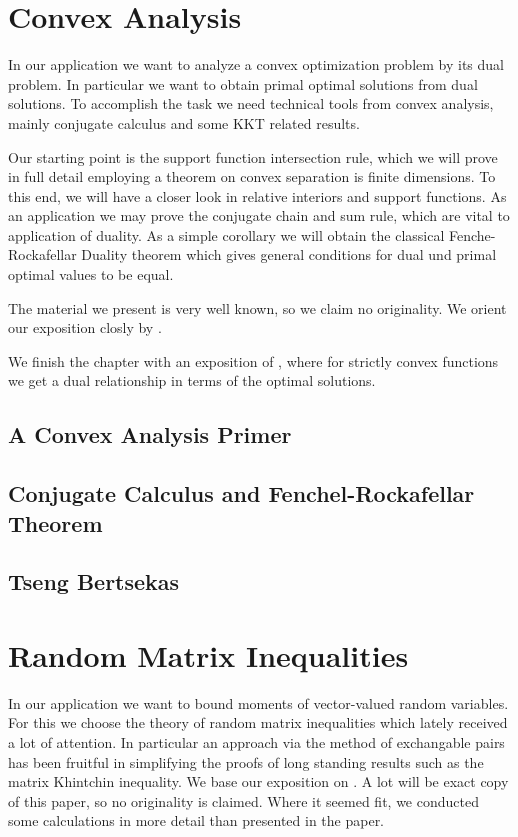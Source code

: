 \documentclass[12pt]{scrreport}
\theoremstyle{remark}
\theoremstyle{plain}
\begin{document}
\chapter{Convex Analysis}
In our application we want to analyze a convex optimization problem by its dual problem.
In particular we want to obtain primal optimal solutions from dual solutions.
To accomplish the task we need technical tools from convex analysis, 
mainly conjugate calculus and some KKT related results.

Our starting point is the support function intersection rule, which we will prove in full detail employing a theorem on convex separation is finite dimensions.
To this end, we will have a closer look in relative interiors and support functions.
As an application we may prove the conjugate chain and sum rule,
which are vital to application of duality. As a simple corollary we will obtain the classical Fenche-Rockafellar Duality theorem
which gives general conditions for dual und primal optimal values to be equal.

The material we present is very well known, so we claim no originality. We orient our exposition closly by
\cite{Rockafellar1970, Mordukhovich2022}
.

We finish the chapter with an exposition of \cite{Tseng1991}, where for strictly convex functions we get a dual relationship in terms of the optimal solutions.
  \section{A Convex Analysis Primer}
  
  \section{Conjugate Calculus and Fenchel-Rockafellar Theorem}
  
%
  \section{Tseng Bertsekas}
  


\chapter{Random Matrix Inequalities}
  In our application we want to bound moments of vector-valued random variables.
  For this we choose the theory of random matrix inequalities
  which lately received a lot of attention.
  In particular an approach via the method of exchangable pairs \cite{Mackey2014}
  has been fruitful in simplifying the proofs of long standing results such as the matrix Khintchin inequality.
  We base our exposition on \cite{Mackey2014}. A lot will be exact copy of this paper, so no originality is claimed. Where it seemed fit, we conducted some calculations in more detail than presented in the paper. 
\end{document}
